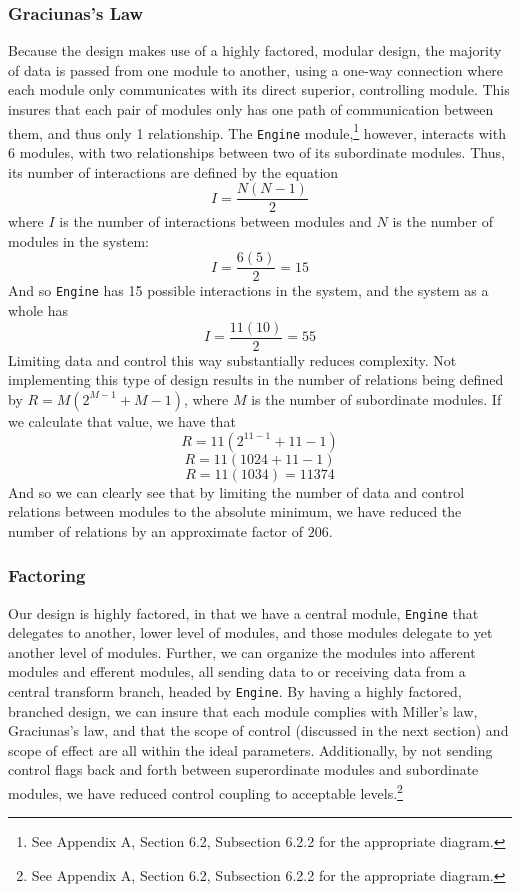 \documentclass{article}
\begin{document}
		\subsubsection{Graciunas's Law}
			Because the design makes use of a highly factored, modular design, the majority of data is passed from one module to another, using a one-way connection where each module only communicates with its direct superior, controlling module. This insures that each pair of modules only has one path of communication between them, and thus only 1 relationship. The \texttt{Engine} module,\footnote{See Appendix A, Section 6.2, Subsection 6.2.2 for the appropriate diagram.} however, interacts with 6 modules, with two relationships between two of its subordinate modules. Thus, its number of interactions are defined by the equation $$I = \frac{N(N - 1)}{2}$$
			where $I$ is the number of interactions between modules and $N$ is the number of modules in the system:
			$$I = \frac{6(5)}{2} = 15$$
			And so \texttt{Engine} has 15 possible interactions in the system, and the system as a whole has 
			$$I = \frac{11(10)}{2} = 55$$
			Limiting data and control this way substantially reduces complexity. Not implementing this type of design results in the number of relations being defined by $R = M(2^{M-1} + M - 1)$, where $M$ is the number of subordinate modules. If we calculate that value, we have that
			$$R = 11(2^{11-1} + 11 - 1)$$
			$$R = 11(1024 + 11 - 1)$$
			$$R = 11(1034) = 11374$$
			And so we can clearly see that by limiting the number of data and control relations between modules to the absolute minimum, we have reduced the number of relations by an approximate factor of $206$. 
		\subsubsection{Factoring}
			Our design is highly factored, in that we have a central module, \texttt{Engine} that delegates to another, lower level of modules, and those modules delegate to yet another level of modules. Further, we can organize the modules into afferent modules and efferent modules, all sending data to or receiving data from a central transform branch, headed by \texttt{Engine}. By having a highly factored, branched design, we can insure that each module complies with Miller's law, Graciunas's law, and that the scope of control (discussed in the next section) and scope of effect are all within the ideal parameters. Additionally, by not sending control flags back and forth between superordinate modules and subordinate modules, we have reduced control coupling to acceptable levels.\footnote{See Appendix A, Section 6.2, Subsection 6.2.2 for the appropriate diagram.}  
\end{document}
